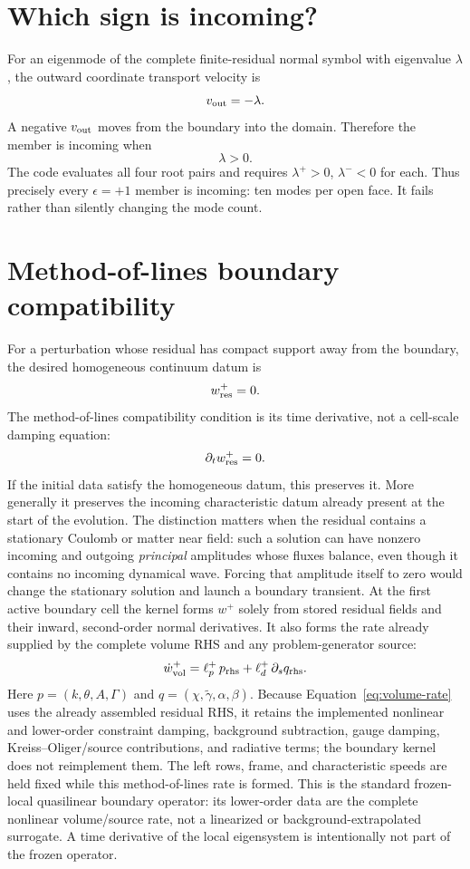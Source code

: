 \documentclass[11pt]{article}
\begin{document}
\section{Which sign is incoming?}

For an eigenmode of the complete finite-residual normal symbol with eigenvalue
\(\lambda\), the outward coordinate transport velocity is
\[
 v_{\rm out}=-\lambda.
\]
A negative \(v_{\rm out}\) moves from the boundary into the domain.  Therefore
the member is incoming when
\[
 \lambda>0.
\]
The code evaluates all four root pairs and requires
\(\lambda^+>0\), \(\lambda^-<0\) for each.  Thus precisely every
\(\epsilon=+1\) member is incoming: ten modes per open face.  It fails rather
than silently changing the mode count.

\section{Method-of-lines boundary compatibility}

For a perturbation whose residual has compact support away from the boundary,
the desired homogeneous continuum datum is
\[
 w^+_{\rm res}=0.
\]
The method-of-lines compatibility condition is its time derivative, not a
cell-scale damping equation:
\[
 \partial_t w^+_{\rm res}=0.
 \label{eq:target}
\]
If the initial data satisfy the homogeneous datum, this preserves it.  More
generally it preserves the incoming characteristic datum already present at
the start of the evolution.  The distinction matters when the residual
contains a stationary Coulomb or matter near field: such a solution can have
nonzero incoming and outgoing \emph{principal} amplitudes whose fluxes
balance, even though it contains no incoming dynamical wave.  Forcing that
amplitude itself to zero would change the stationary solution and launch a
boundary transient.
At the first active boundary cell the kernel forms \(w^+\) solely from stored
residual fields and their inward, second-order normal derivatives.  It also
forms the rate already supplied by the complete volume RHS and any
problem-generator source:
\[
 \dot w^+_{\rm vol}
 =\ell_p^+\,p_{\rm rhs}
  +\ell_d^+\,\partial_s q_{\rm rhs}.
 \label{eq:volume-rate}
\]
Here \(p=(k,\theta,A,\Gamma)\) and
\(q=(\chi,\tilde\gamma,\alpha,\beta)\).  Because
Equation~\eqref{eq:volume-rate} uses the already assembled residual RHS, it
retains the implemented nonlinear and lower-order constraint damping,
background subtraction, gauge damping, Kreiss--Oliger/source contributions,
and radiative terms; the boundary kernel does not reimplement them.
The left rows, frame, and characteristic speeds are held fixed while this
method-of-lines rate is formed.  This is the standard frozen-local
quasilinear boundary operator: its lower-order data are the complete
nonlinear volume/source rate, not a linearized or background-extrapolated
surrogate.  A time derivative of the local eigensystem is intentionally not
part of the frozen operator.
\end{document}

